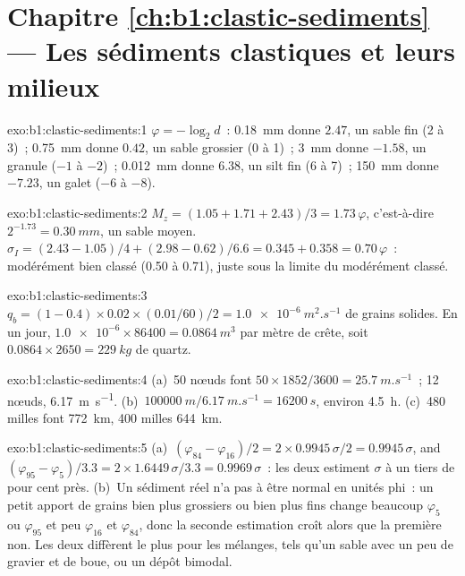 \section*{Chapitre \ref{ch:b1:clastic-sediments} --- Les sédiments clastiques et leurs milieux}

\begin{solution}{exo:b1:clastic-sediments:1}
$\varphi = -\log_2 d$~: \qty{0.18}{mm} donne $2.47$, un sable fin (2 à 3)~;
\qty{0.75}{mm} donne $0.42$, un sable grossier (0 à 1)~; \qty{3}{mm} donne
$-1.58$, un granule ($-1$ à $-2$)~; \qty{0.012}{mm} donne $6.38$, un silt fin (6
à 7)~; \qty{150}{mm} donne $-7.23$, un galet ($-6$ à $-8$).
\end{solution}

\begin{solution}{exo:b1:clastic-sediments:2}
$M_z = (1.05 + 1.71 + 2.43)/3 = 1.73\,\varphi$, c'est-à-dire $2^{-1.73} =
\qty{0.30}{mm}$, un sable moyen. $\sigma_I = (2.43 - 1.05)/4 + (2.98 - 0.62)/6.6
= 0.345 + 0.358 = 0.70\,\varphi$~: modérément bien classé (0.50 à 0.71), juste
sous la limite du modérément classé.
\end{solution}

\begin{solution}{exo:b1:clastic-sediments:3}
$q_b = (1 - 0.4) \times 0.02 \times (\num{0.01}/60)/2 = \qty{1.0e-6}{m^2.s^{-1}}$
de grains solides. En un jour, $\num{1.0e-6} \times 86400 = \qty{0.0864}{m^3}$ par
mètre de crête, soit $0.0864 \times 2650 = \qty{229}{kg}$ de quartz.
\end{solution}

\begin{solution}{exo:b1:clastic-sediments:4}
(a)~50 nœuds font $50 \times 1852/3600 = \qty{25.7}{m.s^{-1}}$~; 12 nœuds,
\qty{6.17}{m.s^{-1}}. (b)~$\qty{100000}{m}/\qty{6.17}{m.s^{-1}} =
\qty{16200}{s}$, environ \qty{4.5}{h}. (c)~480 milles font \qty{772}{km}, 400 milles
\qty{644}{km}.
\end{solution}

\begin{solution}{exo:b1:clastic-sediments:5}
(a)~$(\varphi_{84} - \varphi_{16})/2 = 2 \times 0.9945\,\sigma/2 =
0.9945\,\sigma$, and $(\varphi_{95} - \varphi_5)/3.3 = 2 \times
1.6449\,\sigma/3.3 = 0.9969\,\sigma$~: les deux estiment $\sigma$ à un tiers
de pour cent près. (b)~Un sédiment réel n'a pas à être normal en unités phi~: un petit
apport de grains bien plus grossiers ou bien plus fins change beaucoup $\varphi_5$ ou
$\varphi_{95}$ et peu $\varphi_{16}$ et $\varphi_{84}$, donc la seconde
estimation croît alors que la première non. Les deux diffèrent le plus pour les mélanges, tels
qu'un sable avec un peu de gravier et de boue, ou un dépôt bimodal.
\end{solution}

